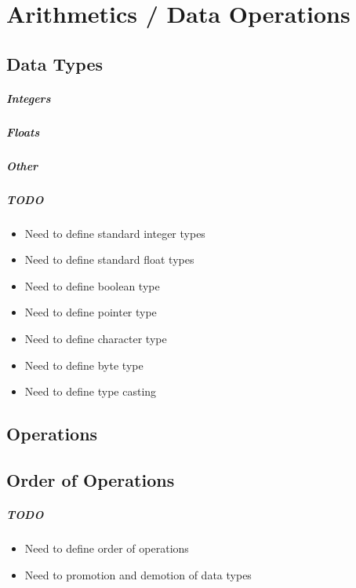 \documentclass{report}
\begin{document}
\chapter{Arithmetics / Data Operations}
	\section{Data Types}
		\paragraph{Integers}
		\paragraph{Floats}
		\paragraph{Other}
		\paragraph{\color{red}TODO}
			\color{red}
			\begin{itemize}
				\item Need to define standard integer types
				\item Need to define standard float types
				\item Need to define boolean type
				\item Need to define pointer type
				\item Need to define character type
				\item Need to define byte type
				\item Need to define type casting
			\end{itemize}
			\color{black}
	\section{Operations}
		


	\section{Order of Operations}

		\paragraph{\color{red}TODO}
			\color{red}
			\begin{itemize}
				\item Need to define order of operations
				\item Need to promotion and demotion of data types
			\end{itemize}
			\color{black}
\end{document}
